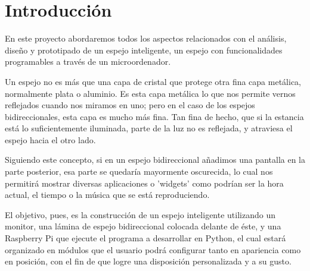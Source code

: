 \chapter{Introducci\'on}\label{intro}
En este proyecto abordaremos todos los aspectos relacionados con el an\'alisis, dise{\~n}o y prototipado de un espejo inteligente, un espejo con funcionalidades programables a trav\'es de un microordenador.

Un espejo no es más que una capa de cristal que protege otra fina capa met\'alica, normalmente plata o aluminio. Es esta capa met\'alica lo que nos permite vernos reflejados cuando nos miramos en uno; pero en el caso de los espejos bidireccionales, esta capa es mucho m\'as fina. Tan fina de hecho, que si la estancia est\'a lo suficientemente iluminada, parte de la luz no es reflejada, y atraviesa el espejo hacia el otro lado.

Siguiendo este concepto, si en un espejo bidireccional a{\~n}adimos una pantalla en la parte posterior, esa parte se quedar\'ia mayormente oscurecida, lo cual nos permitir\'a mostrar diversas aplicaciones o 'widgets' como podrían ser la hora actual, el tiempo o la música que se está reproduciendo.

El objetivo, pues, es la construcción de un espejo inteligente utilizando un monitor, una lámina de espejo bidireccional colocada delante de éste, y una Raspberry Pi que ejecute el programa a desarrollar en Python, el cual estará organizado en m\'odulos que el usuario podr\'a configurar tanto en apariencia como en posici\'on, con el fin de que logre una disposici\'on personalizada y a su gusto.
